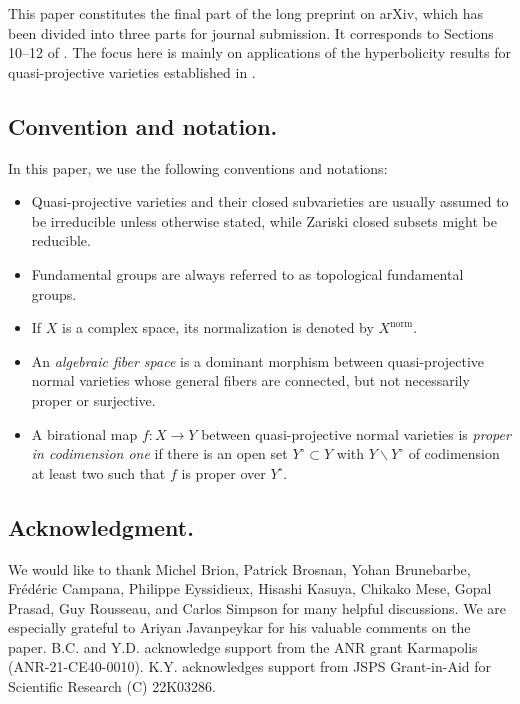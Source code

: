 \documentclass[11pt,english]{smfart}
\theoremstyle{plain}
\theoremstyle{definition}
\theoremstyle{remark}
\numberwithin{equation}{subsection}
\theoremstyle{plain}
\begin{document}
This paper constitutes the final part of the long preprint \cite{CDY22original} on arXiv, which has been divided into three parts for journal submission. It corresponds to Sections 10–12 of \cite{CDY22original}. The focus here is mainly on applications of the hyperbolicity results for quasi-projective varieties established in \cite{CDY22}.

\subsection*{Convention and notation.}In this paper, we use the following conventions and notations:
\begin{itemize}[noitemsep]
	\item Quasi-projective varieties and their closed subvarieties are usually assumed to be irreducible unless otherwise stated, while Zariski closed subsets might be reducible.
	\item Fundamental groups are always referred to as topological fundamental groups.
	\item If $X$ is a complex space, its normalization is denoted by $X^{\mathrm{norm}}$.
	\item An \emph{algebraic fiber space} is a dominant morphism between quasi-projective normal varieties whose general fibers are connected, but not necessarily proper or surjective.
	\item A birational map $f:X\to Y$ between quasi-projective normal varieties is \emph{proper in codimension one} if there is an open set $Y^\circ\subset Y$ with $Y\backslash Y^\circ$ of codimension at least two such that $f$ is proper over $Y^\circ$.
\end{itemize}
 \subsection*{Acknowledgment.}  
 We would like to thank Michel Brion, Patrick Brosnan, Yohan Brunebarbe,  Fr\'ed\'eric Campana, Philippe Eyssidieux, Hisashi Kasuya, Chikako Mese, Gopal Prasad, Guy Rousseau, and Carlos Simpson for many helpful discussions.  
We are especially grateful to Ariyan Javanpeykar for his valuable comments on the paper.  
B.C. and Y.D. acknowledge support from the ANR grant Karmapolis (ANR-21-CE40-0010).  
K.Y. acknowledges support from JSPS Grant-in-Aid for Scientific Research (C) 22K03286.
\end{document}
